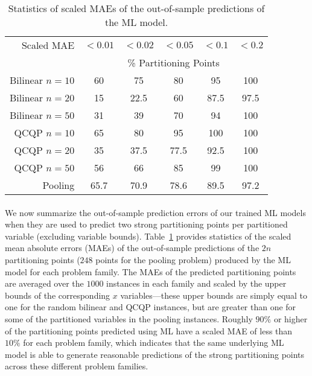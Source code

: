 \documentclass{article}
\newcommand{\pp}{partitioning points}
\begin{document}
\begin{table}[t]
\centering
\begin{tabular}{ r | c c c c c }
\hline
Scaled MAE & $<0.01$ & $<0.02$ & $<0.05$ & $<0.1$ & $<0.2$ \\ 
& \multicolumn{5}{c}{\% Partitioning Points} \\ \hline
Bilinear $n = 10$ &  60  &  75   &  80   &  95  &  100  \\
Bilinear $n = 20$ &  15  &  22.5   &  60  &  87.5  &  97.5  \\
Bilinear $n = 50$ &  31  &  39   &  70  &  94  &  100  \\[0.05in]
QCQP $n = 10$ &  65  &  80   &  95   &  100  &  100  \\
QCQP $n = 20$ &  35  &  37.5   &  77.5  &  92.5  &  100  \\
QCQP $n = 50$ &  56  &  66   &  85  &  99  &  100  \\[0.05in]
Pooling           &  65.7  &  70.9   &  78.6   &  89.5  &  97.2  \\ \hline
\end{tabular}
\caption{Statistics of scaled MAEs of the out-of-sample predictions of the ML model.}
\label{tab:scaled_maes}
\end{table}







\paragraph*{}
We now summarize the out-of-sample prediction errors of our trained ML models when they are used to predict two strong {\pp} per partitioned variable (excluding variable bounds).
Table~\ref{tab:scaled_maes} provides statistics of the scaled mean absolute errors (MAEs) of the out-of-sample predictions of the $2n$ {\pp} ($248$ points for the pooling problem) produced by the ML model for each problem family.
The MAEs of the predicted {\pp} are averaged over the $1000$ instances in each family and scaled by the upper bounds of the corresponding $x$ variables---these upper bounds are simply equal to one for the random bilinear and QCQP instances, but are greater than one for some of the partitioned variables in the pooling instances.
Roughly $90\%$ or higher of the {\pp} predicted using ML have a scaled MAE of less than $10\%$ for each problem family, which indicates that the same underlying ML model is able to generate reasonable predictions of the strong {\pp} across these different problem families.
\end{document}

